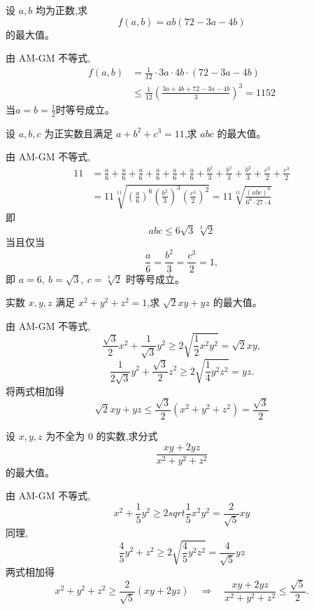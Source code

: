 \begin{questions}
    \question 设 \(a,b\) 均为正数,求
    \[
    f(a,b)=ab (72 - 3a - 4b)
    \]
    的最大值。
    \begin{solution}
        由 AM-GM 不等式,
        \begin{align*}
        f(a,b) &= \frac{1}{12} \cdot 3a \cdot 4b \cdot (72 - 3a - 4b) \\
        &\leq \frac{1}{12}\left(\frac{3a+4b+72-3a-4b}{3}\right)^3 = 1152        
        \end{align*}
        当$a=b=\frac{1}{2}$时等号成立。
    \end{solution}

    \question 设 $a,b,c$ 为正实数且满足 $a+b^{2}+c^{3}=11$,求 $abc$ 的最大值。
    \begin{solution}
        由 AM-GM 不等式,
        \begin{align*}
        11&=\frac{a}{6}+\frac{a}{6}+\frac{a}{6}+\frac{a}{6}+\frac{a}{6}+\frac{a}{6}+\frac{b^{2}}{3}+\frac{b^{2}}{3}+\frac{b^{2}}{3}+\frac{c^{3}}{2}+\frac{c^{3}}{2}\\
        &=11\sqrt[11]{\left(\frac{a}{6}\right)^6\left(\frac{b^2}{3}\right)^3\left(\frac{c^3}{2}\right)^2} = 11\sqrt[11]{\frac{(abc)^6}{6^6\cdot 27\cdot 4}}
        \end{align*}
        即
        \[
        abc \le 6\sqrt{3}\,\sqrt[3]{2}
        \]
        当且仅当
        \[
        \frac{a}{6}=\frac{b^2}{3}=\frac{c^3}{2}=1,
        \]
        即 $a=6,\ b=\sqrt{3},\ c=\sqrt[3]{2}$ 时等号成立。
    \end{solution}

    \question 实数 $x, y, z$ 满足 $x^2 + y^2 + z^2 = 1$,求 $\sqrt{2}xy + yz$ 的最大值。
    \begin{solution}
        由 AM-GM 不等式,
        \[
        \frac{\sqrt{3}}{2} x^2 + \frac{1}{\sqrt{3}} y^2 \ge 2\sqrt{\frac{1}{2} x^2 y^2} = \sqrt{2} xy,
        \]
        \[
        \frac{1}{2\sqrt{3}} y^2 + \frac{\sqrt{3}}{2} z^2 \ge 2\sqrt{\frac{1}{4} y^2 z^2} = yz.
        \]
        将两式相加得
        \[
         \sqrt{2} xy + yz \le \frac{\sqrt{3}}{2}(x^2 + y^2 + z^2) = \frac{\sqrt{3}}{2}
        \]
    \end{solution}

    \question 设 $x,y,z$ 为不全为 $0$ 的实数,求分式
    \[
    \frac{xy+2yz}{x^{2}+y^{2}+z^{2}}
    \]
    的最大值。
    \begin{solution}
        由 AM-GM 不等式,
        \[
        x^2+\frac{1}{5}y^2 \ge 2sqrt{\frac{1}{5}x^2y^2}=\frac{2}{\sqrt{5}} xy
        \]
        同理,
        \[
        \frac{4}{5}y^2 + z^2 \ge 2\sqrt{\frac{4}{5}y^2 z^2} = \frac{4}{\sqrt{5}} yz 
        \]
        两式相加得
        \[
        x^2 + y^2 + z^2 \ge \frac{2}{\sqrt{5}} (xy + 2 yz)
        \quad \Rightarrow \quad \frac{xy+2yz}{x^2+y^2+z^2} \le \frac{\sqrt{5}}{2}.
        \]
    \end{solution}


\end{questions}
